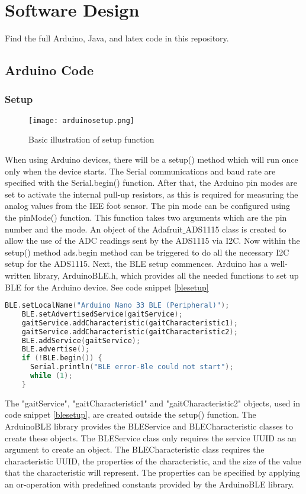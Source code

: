 \graphicspath{{detaileddesign/fig/}}

\chapter{Software Design}
\label{chap:systemdesign}
Find the full Arduino, Java, and latex code in this repository. \cite{dewaldt2022} 
\section{Arduino Code}
\subsection{Setup}
\begin{wrapfigure}{r}{0.2\textwidth}
  \caption{Basic illustration of setup function}
  \texttt{[image: arduinosetup.png]}
\end{wrapfigure}
When using Arduino devices, there will be a setup() method which will run once only when the device starts. The Serial communications and baud rate are specified with the Serial.begin() function. After that, the Arduino pin modes are set to activate the internal pull-up resistors, as this is required for measuring the analog values from the IEE foot sensor. The pin mode can be configured using the pinMode() function. This function takes two arguments which are the pin number and the mode. An object of the Adafruit$\_$ADS1115  class is created to allow the use of the ADC readings sent by the ADS1115 via I2C. Now within the setup() method ads.begin method can be triggered to do all the necessary I2C setup for the ADS1115. Next, the BLE setup commences. Arduino has a well-written library, ArduinoBLE.h, which provides all the needed functions to set up BLE for the Arduino device. See code snippet \ref{blesetup}
\begin{lstlisting}[language=c++, caption=BLE Setup, label=blesetup]
    BLE.setLocalName("Arduino Nano 33 BLE (Peripheral)");
    BLE.setAdvertisedService(gaitService);
    gaitService.addCharacteristic(gaitCharacteristic1);
    gaitService.addCharacteristic(gaitCharacteristic2);
    BLE.addService(gaitService);
    BLE.advertise();
    if (!BLE.begin()) {
      Serial.println("BLE error-Ble could not start");
      while (1);
    }
\end{lstlisting}



The "gaitService", "gaitCharacteristic1" and  "gaitCharacteristic2" objects, used in code snippet \ref{blesetup}, are created outside the setup() function. The ArduinoBLE library provides the BLEService and BLECharacteristic classes to create these objects. The BLEService class only requires the service UUID as an argument to create an object. The BLECharacteristic class requires the characteristic UUID, the properties of the characteristic, and the size of the value that the characteristic will represent. The properties can be specified by applying an or-operation with predefined constants provided by the ArduinoBLE library.

